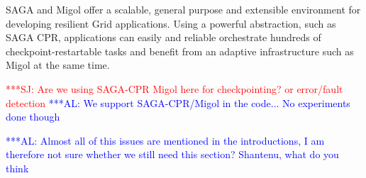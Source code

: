 \documentclass{rspublic}
\newcommand{\alnote}[1]{ {\textcolor{blue} { ***AL: #1 }}}
\newcommand{\jhanote}[1]{ {\textcolor{red} { ***SJ: #1 }}}
\newcommand{\alnote}[1]{}
\newcommand{\jhanote}[1]{}
\begin{document}
SAGA and Migol offer a scalable, general purpose and extensible
environment for developing resilient Grid applications.  Using a
powerful abstraction, such as SAGA CPR, applications can easily and
reliable orchestrate hundreds of checkpoint-restartable tasks and
benefit from an adaptive infrastructure such as Migol at the same
time.

\jhanote{Are we using SAGA-CPR Migol here for checkpointing? or
  error/fault detection} 
\alnote{We support SAGA-CPR/Migol in the code... No experiments done though}  

\alnote{Almost all of this issues are mentioned in the introductions,
  I am therefore not sure whether we still need this section?
  Shantenu, what do you think}

% 
%                  
\end{document}
